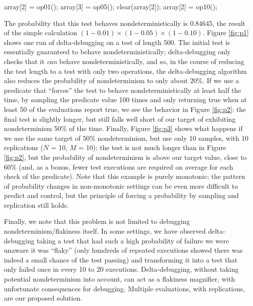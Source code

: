 {\scriptsize
\begin{code}
array[2] = op01();
array[3] = op05();
clear(array[2]);
array[2] = op10();
\end{code}
}

The probability that this test behaves nondeterministically is
0.84645, the result of the simple calculation $(1-0.01) \times
(1-0.05) \times (1-0.10)$.  Figure \ref{fig:p1} shows one run of
delta-debugging on a test of length 500.  The initial test is
essentially guaranteed to behave nondeterministically; delta-debugging
only checks that it \emph{can} behave nondeterministically, and so, in
the course of reducing the test length to a test with only two
operations, the delta-debugging algorithm also reduces the probability
of nondeterminism to only about 20\%.  If we use a predicate that
``forces'' the test to behave nondeterministically at least half the
time, by sampling the predicate value 100 times and only returning
true when at least 50 of the evaluations report true, we see the
behavior in Figure \ref{fig:p2}:  the final test is slightly longer,
but still falls well short of our target of exhibiting nondeterminism
50\% of the time.  Finally, Figure \ref{fig:p3} shows what happens if
we use the same target of 50\% nondeterminism, but use only 10
samples, with 10 replications ($N$ = 10, $M$ = 10):  the test is not
much longer than in Figure \ref{fig:p2}, but the probability of
nondeterminism is above our target value, close to 60\% (and, as a bonus, fewer
test executions are required on average for each check of the predicate).  Note that
this example is purely monotonic; the pattern of probability changes
in non-monotonic settings can be even more difficult to predict and
control, but the principle of forcing a probability by sampling and
replication still holds.

Finally, we note that this problem is not limited to debugging
nondeterminism/flakiness itself.  In some settings, we have observed
delta-debugging taking a test that had such a high probability of
failure we were unaware it was ``flaky'' (only hundreds of repeated executions showed there was
indeed a small chance of the test passing) and transforming it into a
test that only failed once in every 10 to 20 executions.
Delta-debugging, without taking potential nondeterminism into account,
can act as a flakiness magnifier, with unfortunate consequences for
debugging.  Multiple evaluations, with replications, are our proposed solution.